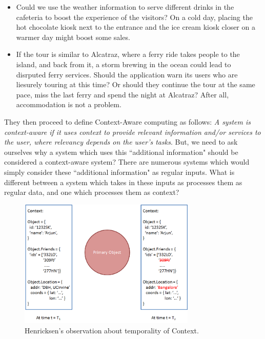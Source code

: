 \begin{itemize}
\item Could we use the weather information to serve different drinks in the cafeteria to boost the experience of the visitors? On a cold day, placing the hot chocolate kiosk next to the entrance and the ice cream kiosk closer on a warmer day might boost some sales.
\item If the tour is similar to Alcatraz, where a ferry ride takes people to the island, and back from it, a storm brewing in the ocean could lead to disrputed ferry services. Should the application warn its users who are liesurely touring at this time? Or should they continue the tour at the same pace, miss the last ferry and spend the night at Alcatraz? After all, accommodation is not a problem.
\end{itemize}

They then proceed to define Context-Aware computing as follows: \textit{A system is context-aware if it uses context to provide relevant information and/or services to the user, where relevancy depends on the user's tasks}. But, we need to ask ourselves why a system which uses this ``additional information" should be considered a context-aware system? There are numerous systems which would simply consider these ``additional information" as regular inputs. What is different between a system which takes in these inputs as processes them as regular data, and one which processes them as context?

\begin{figure}[t]
\centering
\includegraphics[width=0.75\textwidth]{media/chapter2/ka-obs.png}
\caption{Henricksen's observation about temporality of Context.}
\label{fig:karen-obs}
\end{figure}

